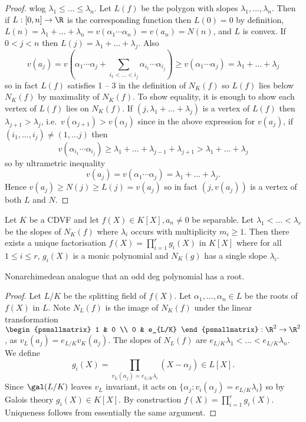 \documentclass[a4paper]{article}
\begin{document}
\begin{proof}
  wlog \(\lambda_1 \leq \dots \leq \lambda_n\). Let \(L(f)\) be the polygon with slopes \(\lambda_1, \dots, \lambda_n\). Then if \(L: [0, n] \to \R\) is the corresponding function then \(L(0) = 0\) by definition, \(L(n) = \lambda_1 + \dots + \lambda_n = v(\alpha_1 \cdots \alpha_n) = v(a_n) = N(n)\), and \(L\) is convex. If \(0 < j < n\) then \(L(j) = \lambda_1 + \dots + \lambda_j\). Also
  \[
    v(a_j) = v(\alpha_1 \cdots \alpha_j + \sum_{i_1 < \dots < i_j} \alpha_{i_1} \cdots \alpha_{i_j}) \geq v(\alpha_1 \cdots \alpha_j) = \lambda_1 + \dots + \lambda_j
  \]
  so in fact \(L(f)\) satisfies 1 -- 3 in the definition of \(N_K(f)\) so \(L(f)\) lies below \(N_K(f)\) by maximality of \(N_K(f)\). To show equality, it is enough to show each vertex of \(L(f)\) lies on \(N_K(f)\). If \((j, \lambda_1 + \dots + \lambda_j)\) is a vertex of \(L(f)\) then \(\lambda_{j + 1} > \lambda_j\), i.e.\ \(v(\alpha_{j + 1}) > v(\alpha_j)\) since in the above expression for \(v(a_j)\), if \((i_1, \dots, i_j) \neq (1, \dots j)\) then
  \[
    v(\alpha_{i_1} \cdots \alpha_{i_j}) \geq \lambda_1 + \dots + \lambda_{j - 1} + \lambda_{j + 1} > \lambda_1 + \dots + \lambda_j
  \]
  so by ultrametric inequality
  \[
    v(a_j) = v(\alpha_1 \cdots \alpha_j) = \lambda_1 + \dots + \lambda_j.
  \]
  Hence \(v(a_j) \geq N(j) \geq L(j) = v(a_j)\) so in fact \((j, v(a_j))\) is a vertex of both \(L\) and \(N\).
\end{proof}

\begin{proposition}
  Let \(K\) be a CDVF and let \(f(X) \in K[X], a_n \neq 0\) be separable. Let \(\lambda_1 < \dots < \lambda_r\) be the slopes of \(N_K(f)\) where \(\lambda_i\) occurs with multiplicity \(m_i \geq 1\). Then there exists a unique factorisation \(f(X) = \prod_{i = 1}^r g_i(X)\) in \(K[X]\) where for all \(1 \leq i \leq r\), \(g_i(X)\) is a monic polynomial and \(N_K(g)\) has a single slope \(\lambda_i\).
\end{proposition}

Nonarchimedean analogue that an odd deg polynomial has a root.

\begin{proof}
  Let \(L/K\) be the splitting field of \(f(X)\). Let \(\alpha_1, \dots, \alpha_n \in L\) be the roots of \(f(X)\) in \(L\). Note \(N_L(f)\) is the image of \(N_K(f)\) under the linear transformation \(
  \begin{psmallmatrix}
    1 & 0 \\
    0 & e_{L/K}
  \end{psmallmatrix}
  :\R^2 \to \R^2\), as \(v_L(a_j) = e_{L/K} v_K(a_j)\). The slopes of \(N_L(f)\) are \(e_{L/K} \lambda_1 < \dots < e_{L/K} \lambda_n\). We define
  \[
    g_i(X) = \prod_{v_L(\alpha_j) = e_{L/K} \lambda_i} (X - \alpha_j) \in L[X].
  \]
  Since \(\gal(L/K)\) leaves \(v_L\) invariant, it acts on \(\{\alpha_j: v_i(\alpha_j) = e_{L/K} \lambda_i\}\) so by Galois theory \(g_i(X) \in K[X]\). By construction \(f(X) = \prod_{i = 1}^r g_i(X)\). Uniqueness follows from essentially the same argument.
\end{proof}
\end{document}

